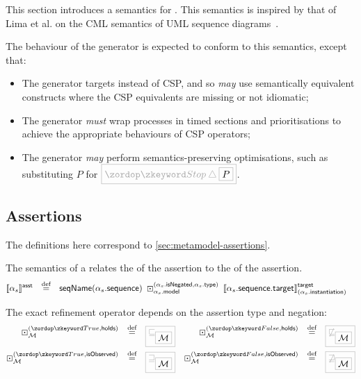 
This section introduces a \tockcsp{} semantics for \langname.
This semantics is inspired by that of Lima et al. on the CML semantics of
UML sequence diagrams~\cite{lima-semantics}.

The behaviour of the \langname{} generator is expected to conform to
this semantics, except that:

\begin{itemize}
\item
  The generator targets \cspm{} instead of CSP, and so \emph{may}
  use semantically equivalent \cspm{} constructs where the CSP equivalents
  are missing or not idiomatic;
\item
  The generator \emph{must} wrap processes in
  timed sections and prioritisations to achieve the appropriate \tockcsp{} behaviours of
  CSP operators;
\item
  The generator \emph{may} perform semantics-preserving optimisations,
  such as substituting \(P\) for \(\tlang{\Stop \interrupt \olang{P}}\).
\end{itemize}


\subsection{Assertions}

The definitions here correspond to \cref{sec:metamodel-assertions}.

\begin{definition}[\massertion]

\newcommand{\refop}[3]{\arefop_{#1}^{(#2, #3)}}

The semantics of a
\msequenceassertion{} relates the \msequence{} of the assertion to the
\mtarget{} of the assertion.
%
\begin{align*}
	\asstsema{\asasst}
\quad\defeq\quad&
	\seqnameOf{\field{\asasst}{sequence}}
	\;
	\refop{\field{\asasst}{model}}{\field{\asasst}{isNegated}}{\field{\asasst}{type}}
	\;
	\targetsema{\field{\field{\asasst}{sequence}}{target}}{\field{\asasst}{instantiation}}
\end{align*}

The exact refinement operator depends on the assertion type and negation:
%
\begin{align*}
	\refop{\amodel}{\true}{\mathsf{holds}}
\quad\defeq\quad&
	\tlang{\sqsubseteq_{\olang{\amodel}}}
&
	\refop{\amodel}{\false}{\mathsf{holds}}
\quad\defeq\quad&
	\tlang{\not\sqsubseteq_{\olang{\amodel}}}
\\
	\refop{\amodel}{\true}{\mathsf{isObserved}}
\quad\defeq\quad&
	\tlang{\sqsupseteq_{\olang{\amodel}}}
&
	\refop{\amodel}{\false}{\mathsf{isObserved}}
\quad\defeq\quad&
	\tlang{\not\sqsupseteq_{\olang{\amodel}}}
\\
\end{align*}
\end{definition}


